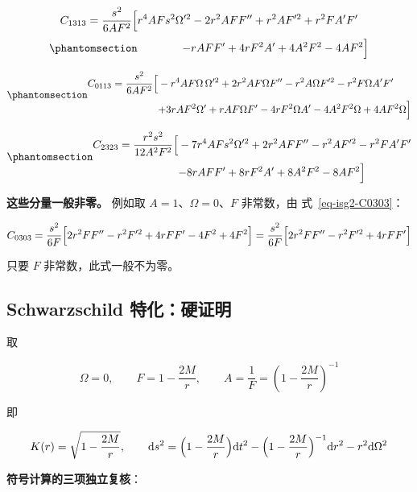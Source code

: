 \documentclass[
  chinese,
  a4paper,
  UTF8,
  12pt,
  oneside,
  openany]{ctexbook}
\theoremstyle{plain}
\theoremstyle{plain}
\theoremstyle{plain}
\theoremstyle{definition}
\theoremstyle{plain}
\theoremstyle{plain}
\theoremstyle{remark}
\begin{document}
\[
C_{1313}=\frac{s^{2}}{6AF^{2}}\Bigl[
r^{4}AFs^{2}\Omega'^{2}-2r^{2}AFF''+r^{2}A F'^{2}+r^{2}F A'F'
\] \begin{equation}\protect\phantomsection\label{eq-isg2-C1313}{
\qquad\qquad -rAFF'+4rF^{2}A'+4A^{2}F^{2}-4AF^{2}\Bigr]
}\end{equation}

\begin{equation}\protect\phantomsection\label{eq-isg2-C0113}{
\begin{aligned}
C_{0113}=\frac{s^{2}}{6AF^{2}}\Bigl[
&-r^{4}AF\Omega\,\Omega'^{2}+2r^{2}AF\Omega F''-r^{2}A\Omega F'^{2}-r^{2}F\Omega A'F'\Bigr.\\[3pt]
&\Bigl.+3rAF^{2}\Omega'+rAF\Omega F'-4rF^{2}\Omega A'-4A^{2}F^{2}\Omega+4AF^{2}\Omega\Bigr]
\end{aligned}
}\end{equation}

\begin{equation}\protect\phantomsection\label{eq-isg2-C2323}{
\begin{aligned}
C_{2323}=\frac{r^{2}s^{2}}{12A^{2}F^{2}}\Bigl[
&-7r^{4}AFs^{2}\Omega'^{2}+2r^{2}AFF''-r^{2}A F'^{2}-r^{2}F A'F'\Bigr.\\[3pt]
&\Bigl.-8rAFF'+8rF^{2}A'+8A^{2}F^{2}-8AF^{2}\Bigr]
\end{aligned}
}\end{equation}

\textbf{这些分量一般非零。} 例如取 \(A=1\)、\(\Omega=0\)、\(F\)
非常数，由 式~\ref{eq-isg2-C0303}：

\[
C_{0303}=\frac{s^{2}}{6F}\Bigl[2r^{2}FF''-r^{2}F'^{2}+4rFF'-4F^{2}+4F^{2}\Bigr]
=\frac{s^{2}}{6F}\Bigl[2r^{2}FF''-r^{2}F'^{2}+4rFF'\Bigr]
\]

只要 \(F\) 非常数，此式一般不为零。

\subsection{Schwarzschild 特化：硬证明}\label{sec-isg2-schwarzschild}

取

\[
\Omega=0,\qquad F=1-\frac{2M}{r},\qquad A=\frac{1}{F}=\left(1-\frac{2M}{r}\right)^{-1}
\]

即

\[
K(r)=\sqrt{1-\frac{2M}{r}},\qquad
\mathrm{d}s^{2}=\Bigl(1-\frac{2M}{r}\Bigr)\mathrm{d}t^{2}
-\Bigl(1-\frac{2M}{r}\Bigr)^{-1}\mathrm{d}r^{2}-r^{2}\mathrm{d}\Omega^{2}
\]

\textbf{符号计算的三项独立复核}：
\end{document}
